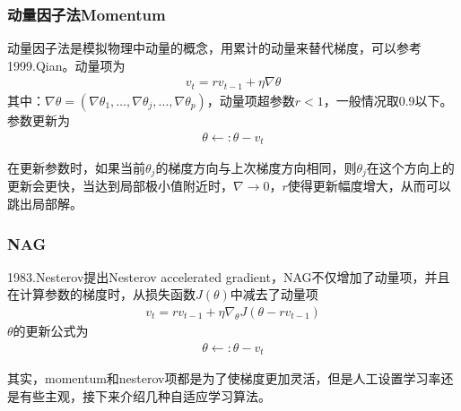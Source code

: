         \subsubsection{动量因子法Momentum}
            \par
            动量因子法是模拟物理中动量的概念，用累计的动量来替代梯度，可以参考1999.Qian\cite{1999.Qian}。动量项为
            \begin{align*}
            v_t = rv_{t-1}+\eta \nabla \theta
            \end{align*}
            其中：$\nabla \theta = (\nabla \theta_1,\dots,\nabla\theta_j,\dots,\nabla\theta_p)$，动量项超参数$r<1$，一般情况取0.9以下。参数更新为
            \begin{align*}
            \theta \leftarrow: \theta - v_t
            \end{align*}
            \par
            在更新参数时，如果当前$\theta_j$的梯度方向与上次梯度方向相同，则$\theta_j$在这个方向上的更新会更快，当达到局部极小值附近时，$\nabla\rightarrow 0$，$r$使得更新幅度增大，从而可以跳出局部解。
        \subsubsection{NAG}
            1983.Nesterov\cite{1983.Nesterov}提出Nesterov accelerated gradient，NAG不仅增加了动量项，并且在计算参数的梯度时，从损失函数$J(\theta)$中减去了动量项
            \begin{align*}
            v_t = r v_{t-1} + \eta \nabla_\theta J(\theta - r v_{t-1})
            \end{align*}
            $\theta$的更新公式为
            \begin{align*}
            \theta \leftarrow :\theta - v_t
            \end{align*}
            \par
            其实，momentum和nesterov项都是为了使梯度更加灵活，但是人工设置学习率还是有些主观，接下来介绍几种自适应学习算法。
